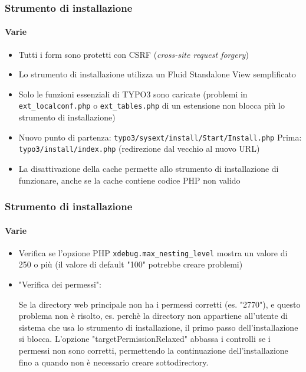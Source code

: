 
\begin{frame}[fragile]
	\frametitle{Strumento di installazione}
	\framesubtitle{Varie}

	\begin{itemize}
		\item Tutti i form sono protetti con CSRF (\textit{cross-site request forgery})
		\item Lo strumento di installazione utilizza un Fluid Standalone View semplificato
		\item Solo le funzioni essenziali di TYPO3 sono caricate\newline
			(problemi in \texttt{ext\_localconf.php} o \texttt{ext\_tables.php} di un estensione non blocca più lo strumento di installazione)
		\item Nuovo punto di partenza:	\tabto{3.2cm} \texttt{typo3/sysext/install/Start/Install.php}\newline
			Prima:					\tabto{3.2cm} \texttt{typo3/install/index.php}\newline
									\tabto{3.2cm} (redirezione dal vecchio al nuovo URL)
		\item La disattivazione della cache permette allo strumento di installazione di funzionare, anche se la cache contiene codice PHP non valido
	\end{itemize}

\end{frame}


\begin{frame}[fragile]
	\frametitle{Strumento di installazione}
	\framesubtitle{Varie}

	\begin{itemize}
		\item Verifica se l'opzione PHP \texttt{xdebug.max\_nesting\_level} mostra un valore di 250 o più (il valore di default "100" potrebbe creare problemi)
		\item "Verifica dei permessi":

			\small
				Se la directory web principale non ha i permessi corretti (es. "2770"),
				e questo problema non è risolto, es. perchè la directory non appartiene
				all'utente di sistema che usa lo strumento di installazione, il primo passo
				dell'installazione si blocca.
				L'opzione "targetPermissionRelaxed" abbassa i controlli se i permessi non 
				sono corretti, permettendo la continuazione dell'installazione fino a quando
				non è necessario creare sottodirectory.
			\normalsize

	\end{itemize}

\end{frame}

